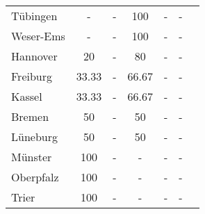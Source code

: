 \begin{table}[H]
\begin{tabularx}{\textwidth}{Xcccccc}
            Tübingen & - & - & 100 & - & - \\
            Weser-Ems & - & - & 100 & - & - \\
            Hannover & 20 & - & 80 & - & - \\
            Freiburg & 33.33 & - & 66.67 & - & - \\
            Kassel & 33.33 & - & 66.67 & - & - \\
            Bremen & 50 & - & 50 & - & - \\
            Lüneburg & 50 & - & 50 & - & - \\
            Münster & 100 & - & - & - & - \\
            Oberpfalz & 100 & - & - & - & - \\
            Trier & 100 & - & - & - & - \\
        \bottomrule
    \end{tabularx}
\end{table}
        